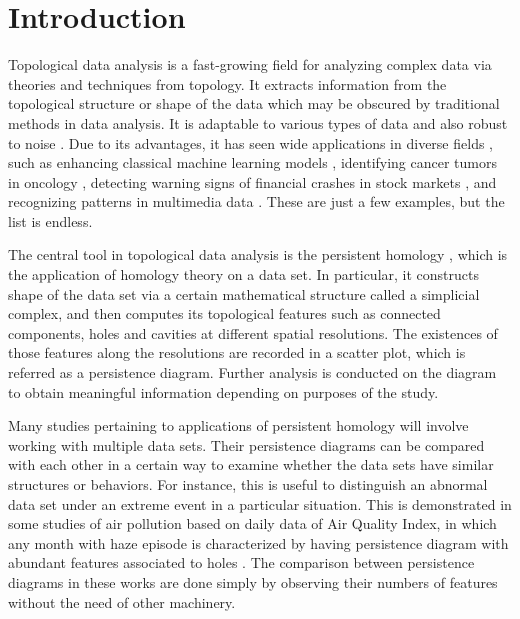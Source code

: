 \documentclass[sn-mathphys-num]{sn-jnl}%
\theoremstyle{thmstyleone}%
\theoremstyle{thmstyletwo}%
\theoremstyle{thmstylethree}%
\begin{document}


\maketitle

\section{Introduction}\label{section: introduction}
Topological data analysis is a fast-growing field for analyzing complex data via theories and techniques from topology. It extracts information from the topological structure or shape of the data which may be obscured by traditional methods in data analysis. It is adaptable to various types of data and also robust to noise \cite{Otter}. Due to its advantages, it has seen wide applications in diverse fields \cite{Wasserman,Chazal_1}, such as enhancing classical machine learning models \cite{Hensel}, identifying cancer tumors in oncology \cite{Skaf}, detecting warning signs of financial crashes in stock markets \cite{Gidea}, and recognizing patterns in multimedia data \cite{Chunyuan,Reise}. These are just a few examples, but the list is endless.

The central tool in topological data analysis is the persistent homology \cite{Edelsbrunner}, which is the application of homology theory on a data set. In particular, it constructs shape of the data set via a certain mathematical structure called a simplicial complex, and then computes its topological features such as connected components, holes and cavities at different spatial resolutions. The existences of those features along the resolutions are recorded in a scatter plot, which is referred as a persistence diagram. Further analysis is conducted on the diagram to obtain meaningful information depending on purposes of the study.

Many studies pertaining to applications of persistent homology will involve working with multiple data sets. Their persistence diagrams can be compared with each other in a certain way to examine whether the data sets have similar structures or behaviors. For instance, this is useful to distinguish an abnormal data set under an extreme event in a particular situation. This is demonstrated in some studies of air pollution based on daily data of Air Quality Index, in which any month with haze episode is characterized by having persistence diagram with abundant features associated to holes \cite{Fariha_1,Fariha_2}. The comparison between persistence diagrams in these works are done simply by observing their numbers of features without the need of other machinery.
\end{document}
